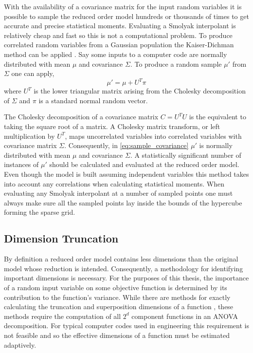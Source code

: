 With the availability of a covariance matrix for the input random variables it is possible to sample the reduced order model hundreds or thousands of times to get accurate and precise statistical moments. Evaluating a Smolyak interpolant is relatively cheap and fast so this is not a computational problem. To produce correlated  random variables from a Gaussian population the Kaiser-Dichman method can be applied \cite{KaiserDichman}. Say some inputs to a computer code are normally distributed with mean $\mu$ and covariance $\Sigma$. To produce a random sample $\mu'$ from $\Sigma$ one can apply,
\begin{equation} \label{eq:sample_covariance}
   \mu' = \mu + U^T\pi
\end{equation} 
where $U^T$ is the lower triangular matrix arising from the Cholesky decomposition of $\Sigma$ and $\pi$ is a standard normal random vector. 

The Cholesky decomposition of a covariance matrix $C=U^{T}U$ is the equivalent to taking the square root of a matrix. A Cholesky matrix transform, or left multiplication by $U^T$, maps uncorrelated variables into correlated variables with covariance matrix $\Sigma$. Consequently, in \ref{eq:sample_covariance} $\mu'$ is normally distributed with mean $\mu$ and covariance $\Sigma$. A statistically significant number of instances of $\mu'$ should be calculated and evaluated at the reduced order model. Even though the model is built assuming independent variables this method takes into account any correlations when calculating statistical moments. When evaluating any Smolyak interpolant at a number of sampled points one must always make sure all the sampled points lay inside the bounds of the hypercube forming the sparse grid.

\subsection{Dimension Truncation} \label{subsec:dimension_truncation}

By definition a reduced order model contains less dimensions than the original model whose reduction is intended. Consequently, a methodology for identifying important dimensions is necessary. For the purposes of this thesis, the importance of a random input variable on some objective function is determined by its contribution to the function's variance. While there are methods for exactly calculating the truncation and superposition dimensions of a function \cite{Holtz}, these methods require the computation of all $2^d$ component functions in an \ac{ANOVA} decomposition. For typical computer codes used in engineering this requirement is not feasible and so the effective dimensions of a function must be estimated adaptively. 

